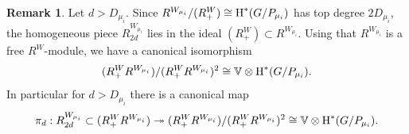 \documentclass[reqno]{amsart}
\numberwithin{equation}{subsection}
\theoremstyle{definition}
\newtheorem{remark}[subsubsection]{Remark}
\def\VV{\mathbb{V}}
\newcommand\Sht{\textup{Sht}}
\newcommand\ot{\otimes}
\newcommand{\cohog}[2]{\textup{H}^{#1}({#2})}     %
\newcommand{\surj}{\twoheadrightarrow}
\newcommand{\s}{\sigma}
\newcommand{\y}{\eta}
\newcommand{\om}{\omega}
\begin{document}
\begin{remark}
    Let $d>D_{\mu_i}$. Since $R^{W_{\mu_i}}/(R^W_+)\cong \cohog{*}{G/P_{\mu_i}}$ has top degree $2D_{\mu_i}$, the homogeneous piece $R^{W_{\mu_i}}_{2d}$ lies in the ideal $(R^W_+)\subset R^{W_{\mu_i}}$. Using that $R^{W_{\mu_i}}$ is a free $R^W$-module, we have a canonical isomorphism
    \begin{equation*}
        (R^W_+R^{W_{\mu_i}})/(R^W_+R^{W_{\mu_i}})^2\cong \VV\ot \cohog{*}{G/P_{\mu_i}}.
    \end{equation*}
    In particular for $d>D_{\mu_i}$ there is a canonical map
    \begin{equation*}
        \pi_d: R^{W_{\mu_i}}_{2d}\subset (R^W_+R^{W_{\mu_i}})\surj(R^W_+R^{W_{\mu_i}})/(R^W_+R^{W_{\mu_i}})^2\cong \VV\ot \cohog{*}{G/P_{\mu_i}}.
    \end{equation*}
\end{remark}


\end{document}
